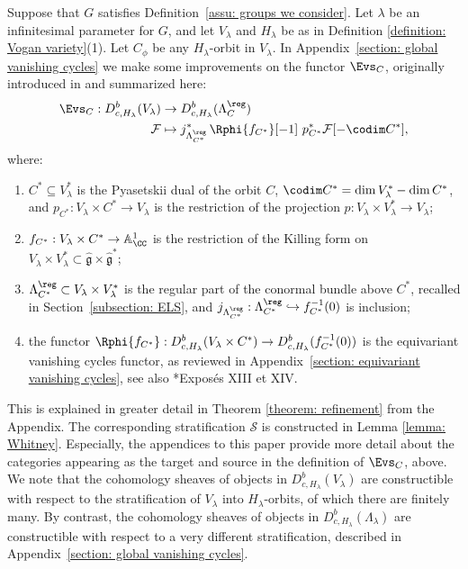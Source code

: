 \documentclass[11pt,letterpaper]{amsart}
\numberwithin{equation}{section}
\begin{document}
Suppose that $G$ satisfies Definition~\ref{assu: groups we consider}.
    Let $\lambda$ be an infinitesimal parameter for $G$, and let $V_{\lambda}$ and $H_{\lambda}$ be as in Definition \ref{definition: Vogan variety}(1).
    Let $C_\phi$ be any $H_\lambda$-orbit in $V_\lambda$.
    In Appendix~\ref{section: global vanishing cycles} we make some improvements on the functor $\Evs_C$, originally introduced in \cite{CFMMX22} and summarized here:
    \begin{align*}
    \Evs_{C}: 
    D^b_{c,H_\lambda}(V_\lambda) &\to D^b_{c,H_\lambda}(\Lambda_C^\reg)\\
    \mathcal{F} &\mapsto j^*_{\Lambda_{C^*}^\reg}\, \Rphi{f_{C^*}}[-1]\ p_{C^*}^* \mathcal{F} [-\codim C^*],
    \end{align*}
    where:
    \begin{enumerate}
        \item 
        $C^* \subseteq V_\lambda^*$ is the Pyasetskii dual of the orbit $C$, $\codim C^*=\dim  V_\lambda^*-\dim C^*$, and $p_{C^*} : V_\lambda \times C^* \to V_\lambda$ is the restriction of the projection $p : V_\lambda \times V_{\lambda}^* \to V_\lambda$;
        \item 
        $f_{C^*}:V_\lambda \times C^* \to \mathbb{A}_\CC^1$ is the restriction of the Killing form on $V_\lambda \times V_\lambda^* \subset \widehat{\mathfrak{g}}\times \widehat{\mathfrak{g}}^{\ast}$;
        \item  
        $\Lambda_{C^*}^\reg\subset V_\lambda \times V_\lambda^*$ is the regular part of the conormal bundle above $C^*$, recalled in Section~\ref{subsection: ELS}, and $j_{\Lambda_{C^*}^\reg} : \Lambda_{C^*}^\reg \hookrightarrow f_{C^*}^{-1}(0)$ is inclusion;
        \item the functor $\Rphi{f_{C^*}} :D^b_{c,H_{\lambda}}(V_\lambda\times C^*) \to D^b_{c,H_\lambda}(f_{C^*}^{-1}(0))$ is the equivariant vanishing cycles functor, as reviewed in Appendix~\ref{section: equivariant vanishing cycles}, see also  \cite{SGA7II}*{Exposés XIII et XIV}.
    \end{enumerate}
This is explained in greater detail in Theorem \ref{theorem: refinement} from the Appendix. The corresponding stratification $\mathscr{S}$ is constructed in Lemma \ref{lemma: Whitney}. 
Especially, the appendices to this paper provide more detail about the categories appearing as the target and source in the definition of $\Evs_C$, above.
We note that the cohomology sheaves of objects in $D^b_{c,H_\lambda}(V_\lambda)$ are constructible with respect to the stratification of $V_{\lambda}$ into $H_{\lambda}$-orbits, of which there are finitely many.
By contrast, the cohomology sheaves of objects in $D^b_{c,H_\lambda}(\Lambda_\lambda)$ are constructible with respect to a very different stratification, described in Appendix~\ref{section: global vanishing cycles}.
\end{document}
